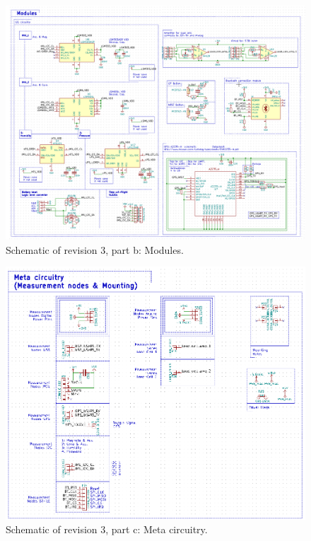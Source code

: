 \begin{figure}[h]
	\centering
    \includegraphics[width=\linewidth]{Figures/schem_r3_b.png}
	\caption{Schematic of revision 3, part b: Modules.}
	\label{fig:schr3b}
\end{figure}
\begin{figure}[h]
	\centering
    \includegraphics[width=\linewidth]{Figures/schem_r3_c.png}
	\caption{Schematic of revision 3, part c: Meta circuitry.}
	\label{fig:schr3c}
\end{figure}

\clearpage
